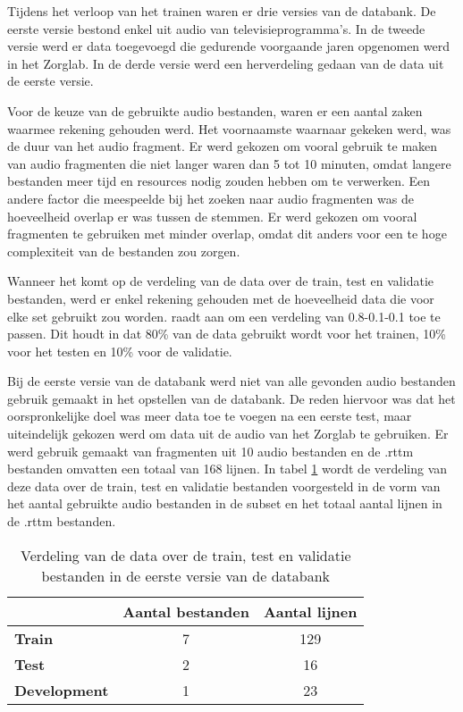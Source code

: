 Tijdens het verloop van het trainen waren er drie versies van de databank. De eerste versie bestond enkel uit audio van televisieprogramma's. In de tweede versie werd er data toegevoegd die gedurende voorgaande jaren opgenomen werd in het Zorglab. In de derde versie werd een herverdeling gedaan van de data uit de eerste versie.

Voor de keuze van de gebruikte audio bestanden, waren er een aantal zaken waarmee rekening gehouden werd. Het voornaamste waarnaar gekeken werd, was de duur van het audio fragment. Er werd gekozen om vooral gebruik te maken van audio fragmenten die niet langer waren dan 5 tot 10 minuten, omdat langere bestanden meer tijd en resources nodig zouden hebben om te verwerken. Een andere factor die meespeelde bij het zoeken naar audio fragmenten was de hoeveelheid overlap er was tussen de stemmen. Er werd gekozen om vooral fragmenten te gebruiken met minder overlap, omdat dit anders voor een te hoge complexiteit van de bestanden zou zorgen.

Wanneer het komt op de verdeling van de data over de train, test en validatie bestanden, werd er enkel rekening gehouden met de hoeveelheid data die voor elke set gebruikt zou worden. \textcite{BredinDatabase} raadt aan om een verdeling van 0.8-0.1-0.1 toe te passen. Dit houdt in dat 80\% van de data gebruikt wordt voor het trainen, 10\% voor het testen en 10\% voor de validatie.

Bij de eerste versie van de databank werd niet van alle gevonden audio bestanden gebruik gemaakt in het opstellen van de databank. De reden hiervoor was dat het oorspronkelijke doel was meer data toe te voegen na een eerste test, maar uiteindelijk gekozen werd om data uit de audio van het Zorglab te gebruiken. Er werd gebruik gemaakt van fragmenten uit 10 audio bestanden en de .rttm bestanden omvatten een totaal van 168 lijnen. In tabel \ref{tbl:verdeling-v1} wordt de verdeling van deze data over de train, test en validatie bestanden voorgesteld in de vorm van het aantal gebruikte audio bestanden in de subset en het totaal aantal lijnen in de .rttm bestanden.

\begin{table}[]
    \begin{tabular}{@{}lcc@{}}
        \toprule
                             & \multicolumn{1}{l}{\textbf{Aantal bestanden}} & \multicolumn{1}{l}{\textbf{Aantal lijnen}} \\ \midrule
        \textbf{Train}       & 7                                             & 129                                        \\
        \textbf{Test}    & 2                                             & 16                     \\
        \textbf{Development} & 1                                             & 23                     \\ \bottomrule
    \end{tabular}
    \caption[Verdeling data eerste versie databank]{\label{tbl:verdeling-v1}Verdeling van de data over de train, test en validatie bestanden in de eerste versie van de databank}
\end{table}

